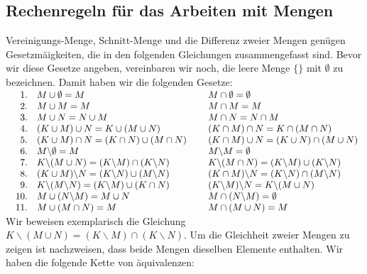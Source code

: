 \subsection{Rechenregeln f\"{u}r das Arbeiten mit Mengen}
 Vereinigungs-Menge,  Schnitt-Menge und die Differenz zweier Mengen gen\"{u}gen Gesetzm\"{a}\3igkeiten, 
die in den folgenden Gleichungen zusammengefasst sind.  Bevor wir diese Gesetze angeben, vereinbaren wir noch,
die leere Menge $\{\}$ mit $\emptyset$ zu bezeichnen. 
Damit haben wir die folgenden Gesetze:
\\[0.2cm]
$\begin{array}{rlcl}
\quad 1. & M \cup \emptyset = M         & \hspace*{0.1cm} & M \cap \emptyset = \emptyset \\
2. & M \cup M = M         & \hspace*{0.1cm} & M \cap M = M          \\
3. & M \cup N = N \cup M  &  & M \cap N = N \cap M  \\
4. & (K \cup M) \cup N = K \cup (M \cup N) &  & (K \cap M) \cap N = K \cap (M \cap N) \\
5. & (K \cup M) \cap N = (K \cap N) \cup (M \cap N) &  & (K \cap M) \cup N = (K \cup N) \cap (M \cup N)  \\
6. & M \backslash \emptyset = M & & M \backslash M = \emptyset \\
7. & K \backslash (M \cup N) = (K \backslash M) \cap (K \backslash N) &&
     K \backslash (M \cap N) = (K \backslash M) \cup (K \backslash N) \\
8. & (K \cup M) \backslash N = (K \backslash N) \cup (M \backslash N) &&
     (K \cap M) \backslash N = (K \backslash N) \cap (M \backslash N) \\
9. & K \backslash (M \backslash N) = (K \backslash M) \cup (K \cap N) &&
     (K \backslash M) \backslash N = K \backslash (M \cup N) \\
10. & M \cup (N \backslash M) = M \cup N &&
      M \cap (N \backslash M) = \emptyset  \\
11. & M \cup (M \cap N) = M  &&
      M \cap (M \cup N) = M 

\end{array}$
\\[0.3cm]
Wir beweisen exemplarisch die Gleichung $K \backslash (M \cup N) = (K \backslash M) \cap (K \backslash N)$.
Um die Gleichheit zweier Mengen zu zeigen ist nachzweisen, dass beide Mengen dieselben Elemente enthalten.
Wir haben die folgende Kette von \"{a}quivalenzen: \\[0.3cm]
